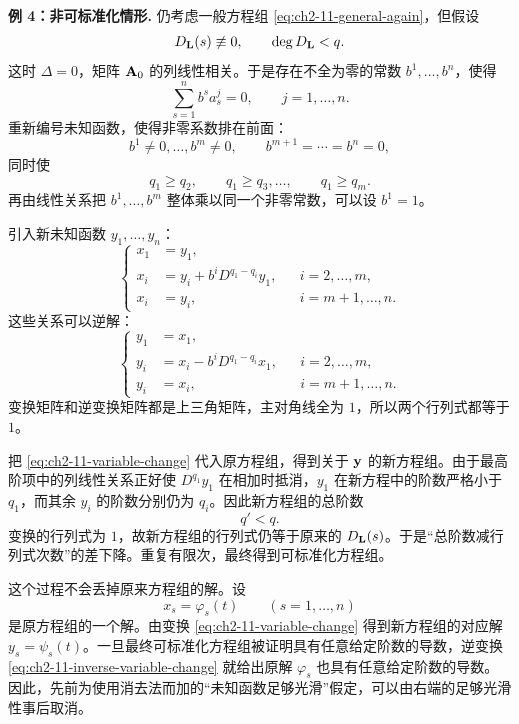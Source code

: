 \noindent\textbf{例 4：非可标准化情形.}
仍考虑一般方程组 \eqref{eq:ch2-11-general-again}，但假设
\[
 D_{\mathbf{L}}(s)\not\equiv0,
 \qquad
 \deg D_{\mathbf{L}}<q.
\]
这时 \(\Delta=0\)，矩阵 \(\mathbf{A}_0\) 的列线性相关。于是存在不全为零的常数 \(b^1,\ldots,b^n\)，使得
\[
 \sum_{s=1}^nb^sa_s^j=0,
 \qquad j=1,\ldots,n.
\]
重新编号未知函数，使得非零系数排在前面：
\begin{equation}
 b^1\ne0,\ldots,b^m\ne0,\qquad
 b^{m+1}=\cdots=b^n=0,
 \label{eq:ch2-11-nonzero-column-coefficients}
\end{equation}
同时使
\[
 q_1\ge q_2,\qquad q_1\ge q_3,\ldots,\qquad q_1\ge q_m.
\]
再由线性关系把 \(b^1,\ldots,b^m\) 整体乘以同一个非零常数，可以设 \(b^1=1\)。

引入新未知函数 \(y_1,\ldots,y_n\)：
\begin{equation}
 \left\{
 \begin{aligned}
  x_1&=y_1,\\
  x_i&=y_i+b^iD^{q_1-q_i}y_1,
  &&i=2,\ldots,m,\\
  x_i&=y_i,&&i=m+1,\ldots,n.
 \end{aligned}
 \right.
 \label{eq:ch2-11-variable-change}
\end{equation}
这些关系可以逆解：
\begin{equation}
 \left\{
 \begin{aligned}
  y_1&=x_1,\\
  y_i&=x_i-b^iD^{q_1-q_i}x_1,
  &&i=2,\ldots,m,\\
  y_i&=x_i,&&i=m+1,\ldots,n.
 \end{aligned}
 \right.
 \label{eq:ch2-11-inverse-variable-change}
\end{equation}
变换矩阵和逆变换矩阵都是上三角矩阵，主对角线全为 \(1\)，所以两个行列式都等于 \(1\)。

把 \eqref{eq:ch2-11-variable-change} 代入原方程组，得到关于 \(\vect{y}\) 的新方程组。由于最高阶项中的列线性关系正好使 \(D^{q_1}y_1\) 在相加时抵消，\(y_1\) 在新方程中的阶数严格小于 \(q_1\)，而其余 \(y_i\) 的阶数分别仍为 \(q_i\)。因此新方程组的总阶数
\[
 q'<q.
\]
变换的行列式为 \(1\)，故新方程组的行列式仍等于原来的 \(D_{\mathbf{L}}(s)\)。于是“总阶数减行列式次数”的差下降。重复有限次，最终得到可标准化方程组。

这个过程不会丢掉原来方程组的解。设
\[
 x_s=\varphi_s(t)
 \qquad(s=1,\ldots,n)
\]
是原方程组的一个解。由变换 \eqref{eq:ch2-11-variable-change} 得到新方程组的对应解 \(y_s=\psi_s(t)\)。一旦最终可标准化方程组被证明具有任意给定阶数的导数，逆变换 \eqref{eq:ch2-11-inverse-variable-change} 就给出原解 \(\varphi_s\) 也具有任意给定阶数的导数。因此，先前为使用消去法而加的“未知函数足够光滑”假定，可以由右端的足够光滑性事后取消。

